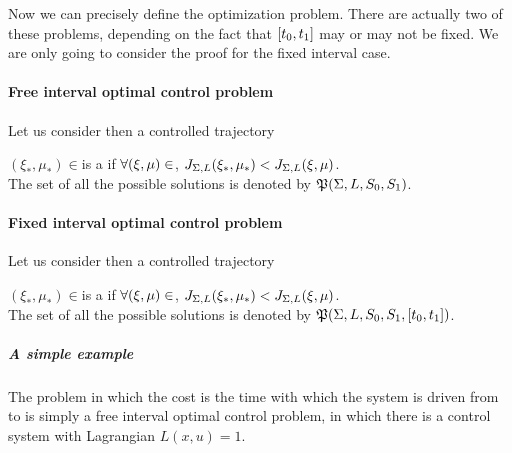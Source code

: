 Now we can precisely define the optimization problem. There are actually two of these problems, depending on the fact that $[t_0,t_1]$ may or may not be fixed. We are only going to consider the proof for the fixed interval case.\\
\paragraph{Free interval optimal control problem}Let us consider  
	then a controlled trajectory {$(\xi_*,\mu_*)\in$\carcSS\space is a  if $\forall(\xi,\mu)\in$\carcSS,  $J_{\Sigma,L}(\xi_*,\mu_*)<J_{\Sigma,L}(\xi,\mu)$.\\
	The set of all the possible solutions is denoted by $\mathfrak{P}(\Sigma,L,S_0,S_1)$.
\paragraph{Fixed interval optimal control problem}Let us consider  
	then a controlled trajectory {$(\xi_*,\mu_*)\in$\carcSSfix is a  if $\forall(\xi,\mu)\in$\carcSSfix, $ J_{\Sigma,L}(\xi_*,\mu_*)<J_{\Sigma,L}(\xi,\mu)$.\\
	The set of all the possible solutions is denoted by $\mathfrak{P}(\Sigma,L,S_0,S_1,[t_0,t_1])$.
\subparagraph{A simple example} The problem in which the cost is the time with which the system is driven from \sz\space to \so is simply a free interval optimal control problem, in which there is a control system with Lagrangian $L(x,u)=1$.


}}
